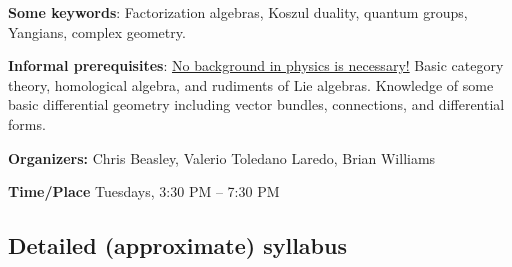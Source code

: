 \documentclass[10pt]{article}
\begin{document}
{\bf Some keywords}: Factorization algebras, Koszul duality, quantum groups, Yangians, complex geometry. 

{\bf Informal prerequisites}: \ul{No background in physics is necessary!} Basic category theory, homological algebra, and rudiments of Lie algebras.
Knowledge of some basic differential geometry including vector bundles, connections, and differential forms. 

{\bf Organizers:} Chris Beasley, Valerio Toledano Laredo, Brian Williams

{\bf Time/Place} Tuesdays, 3:30 PM -- 7:30 PM 

\subsection*{Detailed (approximate) syllabus}
\end{document}
